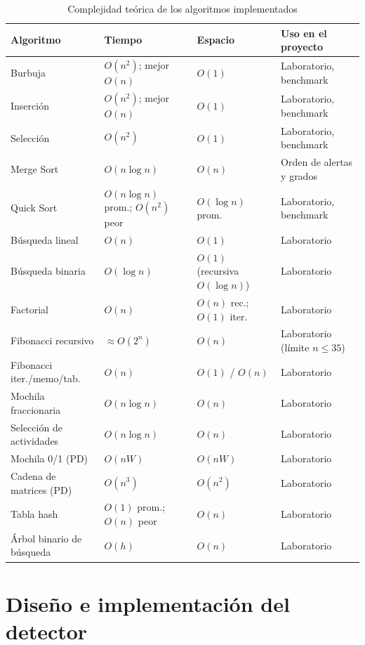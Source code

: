\documentclass[12pt,a4paper]{article}
\begin{document}
\begin{table}[h]
\centering
\caption{Complejidad teórica de los algoritmos implementados}\label{tab:comp}
\small
\begin{tabular}{@{}p{4.2cm}p{4.3cm}p{2.5cm}p{3cm}@{}}
\toprule
\textbf{Algoritmo} & \textbf{Tiempo} & \textbf{Espacio} & \textbf{Uso en el proyecto}\\
\midrule
Burbuja & $O(n^2)$; mejor $O(n)$ & $O(1)$ & Laboratorio, benchmark\\
Inserción & $O(n^2)$; mejor $O(n)$ & $O(1)$ & Laboratorio, benchmark\\
Selección & $O(n^2)$ & $O(1)$ & Laboratorio, benchmark\\
Merge Sort & $O(n\log n)$ & $O(n)$ & Orden de alertas y grados\\
Quick Sort & $O(n\log n)$ prom.; $O(n^2)$ peor & $O(\log n)$ prom. & Laboratorio, benchmark\\
Búsqueda lineal & $O(n)$ & $O(1)$ & Laboratorio\\
Búsqueda binaria & $O(\log n)$ & $O(1)$ (recursiva $O(\log n)$) & Laboratorio\\
Factorial & $O(n)$ & $O(n)$ rec.; $O(1)$ iter. & Laboratorio\\
Fibonacci recursivo & $\approx O(2^n)$ & $O(n)$ & Laboratorio (límite $n\le 35$)\\
Fibonacci iter./memo/tab. & $O(n)$ & $O(1)$ / $O(n)$ & Laboratorio\\
Mochila fraccionaria & $O(n\log n)$ & $O(n)$ & Laboratorio\\
Selección de actividades & $O(n\log n)$ & $O(n)$ & Laboratorio\\
Mochila 0/1 (PD) & $O(nW)$ & $O(nW)$ & Laboratorio\\
Cadena de matrices (PD) & $O(n^3)$ & $O(n^2)$ & Laboratorio\\
Tabla hash & $O(1)$ prom.; $O(n)$ peor & $O(n)$ & Laboratorio\\
Árbol binario de búsqueda & $O(h)$ & $O(n)$ & Laboratorio\\
\bottomrule
\end{tabular}
\end{table}

\section{Diseño e implementación del detector}
\end{document}
